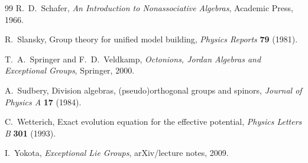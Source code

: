 \documentclass[11pt]{article}
\theoremstyle{plain}
\theoremstyle{definition}
\theoremstyle{remark}
\begin{document}
\begin{thebibliography}{99}
R.~D.~Schafer,
\emph{An Introduction to Nonassociative Algebras},
Academic Press, 1966.

R.~Slansky,
Group theory for unified model building,
\emph{Physics Reports} \textbf{79} (1981).

T.~A.~Springer and F.~D.~Veldkamp,
\emph{Octonions, Jordan Algebras and Exceptional Groups},
Springer, 2000.

A.~Sudbery,
Division algebras, (pseudo)orthogonal groups and spinors,
\emph{Journal of Physics A} \textbf{17} (1984).

C.~Wetterich,
Exact evolution equation for the effective potential,
\emph{Physics Letters B} \textbf{301} (1993).

I.~Yokota,
\emph{Exceptional Lie Groups},
arXiv/lecture notes, 2009.

\end{thebibliography}
\end{document}
